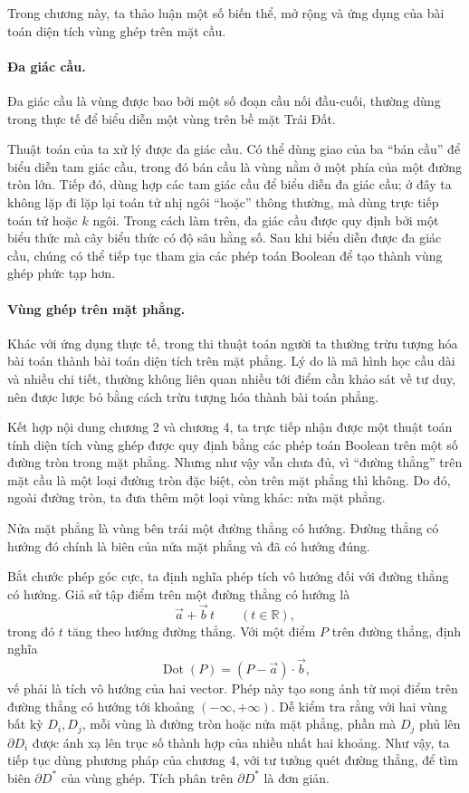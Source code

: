 \documentclass[11pt]{article}
\begin{document}
Trong chương này, ta thảo luận một số biến thể, mở rộng và ứng dụng của bài
toán diện tích vùng ghép trên mặt cầu.

\paragraph{Đa giác cầu.}
Đa giác cầu là vùng được bao bởi một số đoạn cầu nối đầu-cuối, thường dùng
trong thực tế để biểu diễn một vùng trên bề mặt Trái Đất.

Thuật toán của ta xử lý được đa giác cầu. Có thể dùng giao của ba ``bán cầu''
để biểu diễn tam giác cầu, trong đó bán cầu là vùng nằm ở một phía của một
đường tròn lớn. Tiếp đó, dùng hợp các tam giác cầu để biểu diễn đa giác cầu; ở
đây ta không lặp đi lặp lại toán tử nhị ngôi ``hoặc'' thông thường, mà dùng
trực tiếp toán tử hoặc \(k\) ngôi. Trong cách làm trên, đa giác cầu được quy
định bởi một biểu thức mà cây biểu thức có độ sâu hằng số. Sau khi biểu diễn
được đa giác cầu, chúng có thể tiếp tục tham gia các phép toán Boolean để tạo
thành vùng ghép phức tạp hơn.

\paragraph{Vùng ghép trên mặt phẳng.}
Khác với ứng dụng thực tế, trong thi thuật toán người ta thường trừu tượng hóa
bài toán thành bài toán diện tích trên mặt phẳng. Lý do là mã hình học cầu dài
và nhiều chi tiết, thường không liên quan nhiều tới điểm cần khảo sát về tư
duy, nên được lược bỏ bằng cách trừu tượng hóa thành bài toán phẳng.

Kết hợp nội dung chương 2 và chương 4, ta trực tiếp nhận được một thuật toán
tính diện tích vùng ghép được quy định bằng các phép toán Boolean trên một số
đường tròn trong mặt phẳng. Nhưng như vậy vẫn chưa đủ, vì ``đường thẳng'' trên
mặt cầu là một loại đường tròn đặc biệt, còn trên mặt phẳng thì không. Do đó,
ngoài đường tròn, ta đưa thêm một loại vùng khác: nửa mặt phẳng.

Nửa mặt phẳng là vùng bên trái một đường thẳng có hướng. Đường thẳng có hướng
đó chính là biên của nửa mặt phẳng và đã có hướng đúng.

Bắt chước phép góc cực, ta định nghĩa phép tích vô hướng đối với đường thẳng có
hướng. Giả sử tập điểm trên một đường thẳng có hướng là
\[
  \vec a+\vec b\,t\qquad(t\in\mathbb R),
\]
trong đó \(t\) tăng theo hướng đường thẳng. Với một điểm \(P\) trên đường
thẳng, định nghĩa
\[
  \operatorname{Dot}(P)=(P-\vec a)\cdot\vec b,
\]
vế phải là tích vô hướng của hai vector. Phép này tạo song ánh từ mọi điểm trên
đường thẳng có hướng tới khoảng \((-\infty,+\infty)\). Dễ kiểm tra rằng với
hai vùng bất kỳ \(D_i,D_j\), mỗi vùng là đường tròn hoặc nửa mặt phẳng, phần mà
\(D_j\) phủ lên \(\partial D_i\) được ánh xạ lên trục số thành hợp của nhiều
nhất hai khoảng. Như vậy, ta tiếp tục dùng phương pháp của chương 4, với tư
tưởng quét đường thẳng, để tìm biên \(\partial D^*\) của vùng ghép. Tích phân
trên \(\partial D^*\) là đơn giản.
\end{document}
